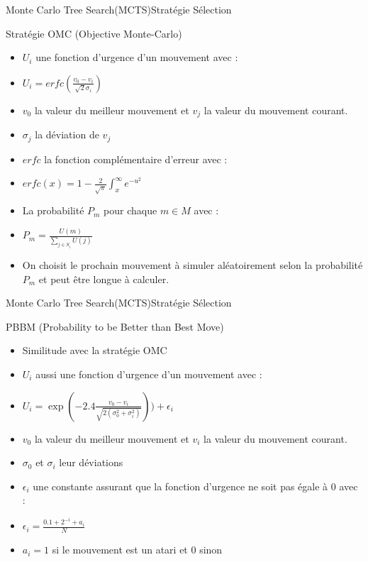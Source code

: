\begin{frame}{Monte Carlo Tree Search(MCTS)}{Stratégie Sélection}
	\begin{block}{Stratégie OMC (Objective Monte-Carlo)}
		\begin{itemize}
			\item $U_{i}$ une fonction d'urgence d'un mouvement avec :
			\item $U_{i} = erfc(\frac{v_{0} - v_{i}}{\sqrt{2}\sigma_{i}})$
			\item $v_{0}$ la valeur du meilleur mouvement et $v_{j}$ la valeur du mouvement courant.
			\item $\sigma_{j}$ la déviation de $v_{j}$
			\item $erfc$ la fonction complémentaire d'erreur avec :
			\item $erfc(x) = 1 - \frac{2}{\sqrt{\pi}}\int_{x}^{\infty}e^{-u^{2}}$
			\item La probabilité $P_{m}$ pour chaque $m \in M$ avec :
			\item $P_{m} = \frac{U(m)}{\sum_{j \in S_{i}}^{}U(j)}$
			\item On choisit le prochain mouvement à simuler aléatoirement selon la probabilité $P_{m}$ et peut être longue à calculer.
		\end{itemize}
	\end{block}
\end{frame}

\begin{frame}{Monte Carlo Tree Search(MCTS)}{Stratégie Sélection}
	\begin{block}{PBBM (Probability to be Better than Best Move)}
		\begin{itemize}
			\item Similitude avec la stratégie OMC
			\item $U_{i}$ aussi une fonction d'urgence d'un mouvement avec :
			\item $U_{i} = \exp(-2.4\frac{v_{0} - v_{i}}{\sqrt{2(\sigma_{0}^2 + \sigma_{i}^2)}})) + \epsilon_{i}$
			\item $v_{0}$ la valeur du meilleur mouvement et $v_{i}$ la valeur du mouvement courant.
			\item $\sigma_{0}$ et $\sigma_{i}$ leur déviations
			\item $\epsilon_ {i}$ une constante assurant que la fonction d'urgence ne soit pas égale à 0 avec :
			\item $\epsilon_ {i} = \frac{0.1 + 2^{-i} + a_{i}}{N}$
			\item $a_{i} = 1$ si le mouvement est un atari et $0$ sinon 
		\end{itemize}
	\end{block}
\end{frame}

